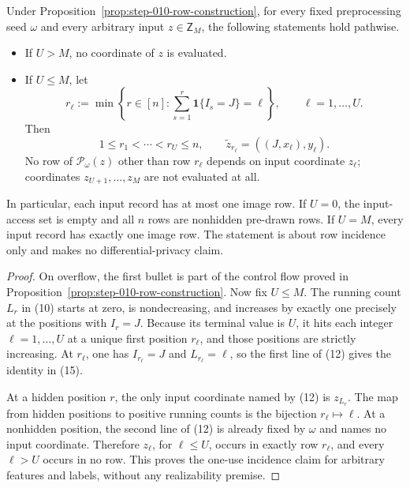 \begin{lemma}\label{lem:step-010-one-use}
Under Proposition~\ref{prop:step-010-row-construction}, for every fixed
preprocessing seed \(\omega\) and every arbitrary input
\(z\in\mathsf Z_M\), the following statements hold pathwise.

\begin{itemize}
\item If \(U>M\), no coordinate of \(z\) is evaluated.
\item If \(U\le M\), let
  \[
    r_\ell:=\min\left\{r\in[n]:
      \sum_{s=1}^r\mathbf1\{I_s=J\}=\ell\right\},
    \qquad \ell=1,\ldots,U.
  \tag{14}
  \]
  Then
  \[
    1\le r_1<\cdots<r_U\le n,
    \qquad
    \widetilde z_{r_\ell}=((J,x_\ell),y_\ell).
  \tag{15}
  \]
  No row of \(\mathcal P_\omega(z)\) other than row \(r_\ell\) depends on
  input coordinate \(z_\ell\); coordinates \(z_{U+1},\ldots,z_M\) are not
  evaluated at all.
\end{itemize}

In particular, each input record has at most one image row. If \(U=0\), the
input-access set is empty and all \(n\) rows are nonhidden pre-drawn rows.
If \(U=M\), every input record has exactly one image row. The statement is
about row incidence only and makes no differential-privacy claim.
\end{lemma}

\begin{proof}
On overflow, the first bullet is part of the control flow proved in
Proposition~\ref{prop:step-010-row-construction}. Now fix \(U\le M\). The
running count \(L_r\) in (10) starts at zero, is nondecreasing, and
increases by exactly one precisely at the positions with \(I_r=J\).
Because its terminal value is \(U\), it hits each integer
\(\ell=1,\ldots,U\) at a unique first position \(r_\ell\), and those
positions are strictly increasing. At \(r_\ell\), one has
\(I_{r_\ell}=J\) and \(L_{r_\ell}=\ell\), so the first line of (12) gives
the identity in (15).

At a hidden position \(r\), the only input coordinate named by (12) is
\(z_{L_r}\). The map from hidden positions to positive running counts is
the bijection \(r_\ell\mapsto\ell\). At a nonhidden position, the second
line of (12) is already fixed by \(\omega\) and names no input coordinate.
Therefore \(z_\ell\), for \(\ell\le U\), occurs in exactly row \(r_\ell\),
and every \(\ell>U\) occurs in no row. This proves the one-use incidence
claim for arbitrary features and labels, without any realizability premise.
\end{proof}

